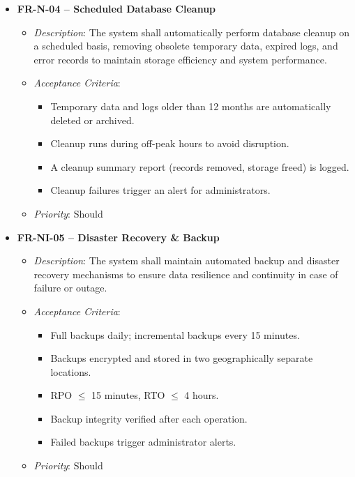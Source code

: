 \begin{itemize}
    \item \textbf{FR-N-04 – Scheduled Database Cleanup}
        \begin{itemize}
            \item \textit{Description}: The system shall automatically perform database cleanup on a scheduled basis, removing obsolete temporary data, expired logs, and error records to maintain storage efficiency and system performance.
            \item \textit{Acceptance Criteria}: 
                \begin{itemize}
                    \item Temporary data and logs older than 12 months are automatically deleted or archived.
                    \item Cleanup runs during off-peak hours to avoid disruption.
                    \item A cleanup summary report (records removed, storage freed) is logged.
                    \item Cleanup failures trigger an alert for administrators.
                \end{itemize}
            \item \textit{Priority}: Should
        \end{itemize}

    \item \textbf{FR-NI-05 – Disaster Recovery \& Backup}
        \begin{itemize}
            \item \textit{Description}: The system shall maintain automated backup and disaster recovery mechanisms to ensure data resilience and continuity in case of failure or outage.
            \item \textit{Acceptance Criteria}: 
                \begin{itemize}
                    \item Full backups daily; incremental backups every 15 minutes.
                    \item Backups encrypted and stored in two geographically separate locations.
                    \item RPO \(\leq \) 15 minutes, RTO \(\leq \) 4 hours.
                    \item Backup integrity verified after each operation.
                    \item Failed backups trigger administrator alerts.
                \end{itemize}
            \item \textit{Priority}: Should
        \end{itemize}


\end{itemize}
